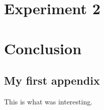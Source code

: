 \documentclass{l4proj}
\begin{document}
\chapter{Experiment 2}



\chapter{Conclusion}




\begin{appendices}

\chapter{My first appendix}
This is what was interesting.

\end{appendices}




\end{document}
